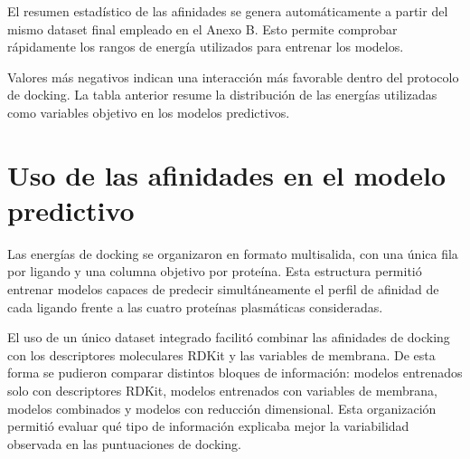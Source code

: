 \documentclass[
  spanish,
  a4paper,
  12pt,
  oneside,
  openany]{memoir}
\begin{document}
El resumen estadístico de las afinidades se genera automáticamente a
partir del mismo dataset final empleado en el Anexo B. Esto permite
comprobar rápidamente los rangos de energía utilizados para entrenar los
modelos.

\begin{table}

\caption{\label{tbl-anexo-docking-estadisticos}Resumen estadístico de energías de docking ligando-proteína. Los valores se expresan en kcal/mol.}


\end{table}%

Valores más negativos indican una interacción más favorable dentro del
protocolo de docking. La tabla anterior resume la distribución de las
energías utilizadas como variables objetivo en los modelos predictivos.

\section{Uso de las afinidades en el modelo predictivo}

Las energías de docking se organizaron en formato multisalida, con una
única fila por ligando y una columna objetivo por proteína. Esta
estructura permitió entrenar modelos capaces de predecir simultáneamente
el perfil de afinidad de cada ligando frente a las cuatro proteínas
plasmáticas consideradas.

El uso de un único dataset integrado facilitó combinar las afinidades de
docking con los descriptores moleculares RDKit y las variables de
membrana. De esta forma se pudieron comparar distintos bloques de
información: modelos entrenados solo con descriptores RDKit, modelos
entrenados con variables de membrana, modelos combinados y modelos con
reducción dimensional. Esta organización permitió evaluar qué tipo de
información explicaba mejor la variabilidad observada en las
puntuaciones de docking.
\end{document}
